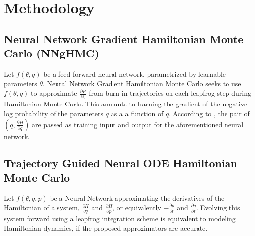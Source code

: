 \documentclass{article}
\theoremstyle{plain}
\theoremstyle{definition}
\theoremstyle{remark}
\begin{document}
\section{Methodology}
\subsection{Neural Network Gradient Hamiltonian Monte Carlo (NNgHMC)}
Let $f (\theta, q)$ be a feed-forward neural network, parametrized by learnable parameters $\theta$. Neural Network Gradient Hamiltonian Monte Carlo seeks to use $f(\theta, q)$ to approximate $\frac{\partial H}{\partial q}$ from burn-in trajectories on each leapfrog step during Hamiltonian Monte Carlo. This amounts to learning the gradient of the negative log probability of the parameters $q$ as a a function of $q$. According to \cite{Li_2019}, the pair of $(q, \frac{\partial H}{\partial q})$ are passed as training input and output for the aforementioned neural network.  





\subsection{Trajectory Guided Neural ODE Hamiltonian Monte Carlo}
Let $f(\theta, q, p)$ be a Neural Network  approximating the derivatives of the Hamiltonian of a system, $\frac{\partial H}{\partial q}$ and $\frac{\partial H}{\partial p}$, or equivalently $ -\frac{\partial p}{\partial t}$ and $\frac{\partial q}{\partial t}$. Evolving this system forward using a leapfrog integration scheme is equivalent to modeling Hamiltonian dynamics, if the proposed approximators are accurate.  
\end{document}
